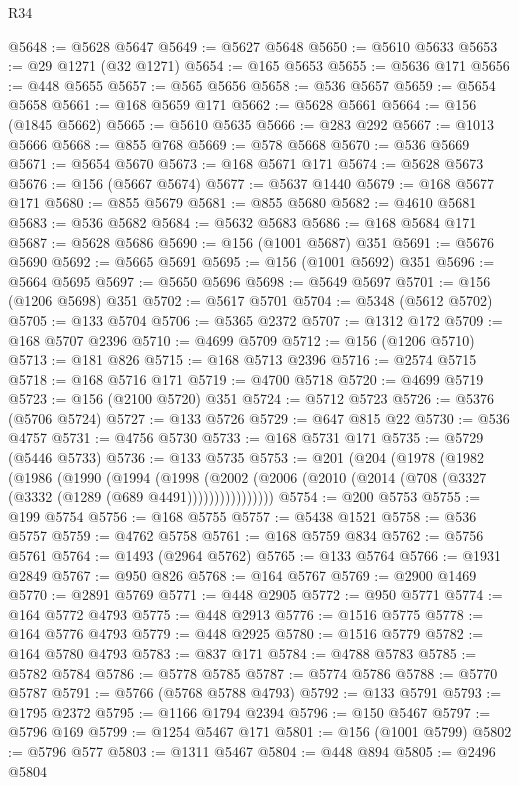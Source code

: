 \begin{lexlean}{R34}
\begin{coremodule}
@5648 := @5628 @5647
@5649 := @5627 @5648
@5650 := @5610 @5633
@5653 := @29 @1271 (@32 @1271)
@5654 := @165 @5653
@5655 := @5636 @171
@5656 := @448 @5655
@5657 := @565 @5656
@5658 := @536 @5657
@5659 := @5654 @5658
@5661 := @168 @5659 @171
@5662 := @5628 @5661
@5664 := @156 (@1845 @5662)
@5665 := @5610 @5635
@5666 := @283 @292
@5667 := @1013 @5666
@5668 := @855 @768
@5669 := @578 @5668
@5670 := @536 @5669
@5671 := @5654 @5670
@5673 := @168 @5671 @171
@5674 := @5628 @5673
@5676 := @156 (@5667 @5674)
@5677 := @5637 @1440
@5679 := @168 @5677 @171
@5680 := @855 @5679
@5681 := @855 @5680
@5682 := @4610 @5681
@5683 := @536 @5682
@5684 := @5632 @5683
@5686 := @168 @5684 @171
@5687 := @5628 @5686
@5690 := @156 (@1001 @5687) @351
@5691 := @5676 @5690
@5692 := @5665 @5691
@5695 := @156 (@1001 @5692) @351
@5696 := @5664 @5695
@5697 := @5650 @5696
@5698 := @5649 @5697
@5701 := @156 (@1206 @5698) @351
@5702 := @5617 @5701
@5704 := @5348 (@5612 @5702)
@5705 := @133 @5704
@5706 := @5365 @2372
@5707 := @1312 @172
@5709 := @168 @5707 @2396
@5710 := @4699 @5709
@5712 := @156 (@1206 @5710)
@5713 := @181 @826
@5715 := @168 @5713 @2396
@5716 := @2574 @5715
@5718 := @168 @5716 @171
@5719 := @4700 @5718
@5720 := @4699 @5719
@5723 := @156 (@2100 @5720) @351
@5724 := @5712 @5723
@5726 := @5376 (@5706 @5724)
@5727 := @133 @5726
@5729 := @647 @815 @22
@5730 := @536 @4757
@5731 := @4756 @5730
@5733 := @168 @5731 @171
@5735 := @5729 (@5446 @5733)
@5736 := @133 @5735
@5753 := @201
    (@204
      (@1978
        (@1982
          (@1986
            (@1990
              (@1994
                (@1998
                  (@2002 (@2006 (@2010 (@2014 (@708 (@3327 (@3332 (@1289 (@689 @4491))))))))))))))))
@5754 := @200 @5753
@5755 := @199 @5754
@5756 := @168 @5755
@5757 := @5438 @1521
@5758 := @536 @5757
@5759 := @4762 @5758
@5761 := @168 @5759 @834
@5762 := @5756 @5761
@5764 := @1493 (@2964 @5762)
@5765 := @133 @5764
@5766 := @1931 @2849
@5767 := @950 @826
@5768 := @164 @5767
@5769 := @2900 @1469
@5770 := @2891 @5769
@5771 := @448 @2905
@5772 := @950 @5771
@5774 := @164 @5772 @4793
@5775 := @448 @2913
@5776 := @1516 @5775
@5778 := @164 @5776 @4793
@5779 := @448 @2925
@5780 := @1516 @5779
@5782 := @164 @5780 @4793
@5783 := @837 @171
@5784 := @4788 @5783
@5785 := @5782 @5784
@5786 := @5778 @5785
@5787 := @5774 @5786
@5788 := @5770 @5787
@5791 := @5766 (@5768 @5788 @4793)
@5792 := @133 @5791
@5793 := @1795 @2372
@5795 := @1166 @1794 @2394
@5796 := @150 @5467
@5797 := @5796 @169
@5799 := @1254 @5467 @171
@5801 := @156 (@1001 @5799)
@5802 := @5796 @577
@5803 := @1311 @5467
@5804 := @448 @894
@5805 := @2496 @5804

\end{coremodule}
\end{lexlean}
